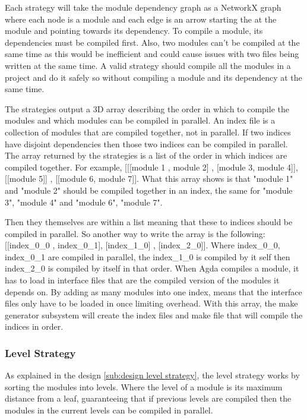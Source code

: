 Each strategy will take the module dependency graph as a NetworkX graph where
each node is a module and each edge is an arrow starting the at the module and
pointing towards its dependency. To compile a module, its dependencies must be
compiled first. Also, two modules can't be compiled at the same time as this
would be inefficient and could cause issues with two files being written at the
same time. A valid strategy should compile all the modules in a project and do
it safely so without compiling a module and its dependency at the same time. 

The strategies output a 3D array describing the order in which to compile the
modules and which modules can be compiled in parallel. An index file is a
collection of modules that are compiled together, not in parallel. If two
indices have disjoint dependencies then those two indices can be compiled in
parallel. The array returned by the strategies is a list of the order in which
indices are compiled together. For example, [[[module 1 , module 2] , [module
3, module 4]], [[module 5]] , [[module 6, module 7]]. What this array shows is
that "module 1" and "module 2" should be compiled together in an index, the
same for "module 3", "module 4" and "module 6", "module 7". 

Then they themselves are within a list meaning that these to indices should be
compiled in parallel. So another way to write the array is the following:
[[index\_0\_0 , index\_0\_1], [index\_1\_0] , [index\_2\_0]]. Where
index\_0\_0, index\_0\_1 are compiled in parallel, the index\_1\_0 is compiled
by it self then index\_2\_0 is compiled by itself in that order. When Agda
compiles a module, it has to load in interface files that are the compiled
version of the modules it depends on. By adding as many modules into one index,
means that the interface files only have to be loaded in once limiting
overhead. With this array, the make generator subsystem will create the index
files and make file that will compile the indices in order.

\subsubsection{Level Strategy} \label{sub:imp lvl strategy}

As explained in the design \cref{sub:design level strategy}, the level
strategy works by sorting the modules into levels. Where the level of a module
is its maximum distance from a leaf, guaranteeing that if previous levels are
compiled then the modules in the current levels can be compiled in parallel.

